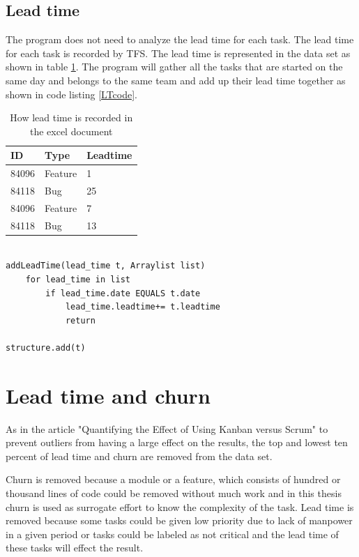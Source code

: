 \documentclass[UKenglish]{ifimaster}  %
\begin{document}
\subsection{Lead time}
\label{sec:LT}
The program does not need to analyze  the lead time for each task. The lead time for each task is recorded by TFS. The lead time is represented in the data set as shown in table \ref{table:LT}. The program will gather all the tasks that are started on the same day and belongs to the same team and add up their lead time together as shown in code listing \ref{LTcode}.   
\begin{table}[!ht]
\begin{center}
\begin{tabular}{ | l | l | l | }
\hline
	ID & Type & Leadtime \\ \hline
	84096 &  Feature  & 1 \\ \hline
	84118 &  Bug  & 25 \\ \hline
	84096 &  Feature  & 7 \\ \hline
	84118 &  Bug  & 13 \\ \hline
\end{tabular}
\caption{How lead time is recorded in the excel document}
\label{table:LT} %
\end{center}
\end{table}

\begin{minipage}{\textwidth}
\begin{lstlisting}[caption=Pseudocode example of lead time is measured, label=LTcode]

addLeadTime(lead_time t, Arraylist list)
	for lead_time in list
		if lead_time.date EQUALS t.date
			lead_time.leadtime+= t.leadtime
			return
			
structure.add(t)
\end{lstlisting}
\end{minipage}
\section{Lead time and churn}
As in the article "Quantifying the Effect of Using Kanban versus Scrum" \parencite{Dag} to prevent outliers from having a large effect on the results, the top and lowest ten percent of lead time and churn are removed from the data set.

Churn is removed because a module or a feature, which consists of hundred or thousand lines of code could be removed without much work and in this thesis churn is used as surrogate effort to know the complexity of the task. Lead time is removed because some tasks could be given low priority due to lack of manpower in a given period or tasks could be labeled as not critical and the lead time of these tasks will effect the result.
\end{document}
